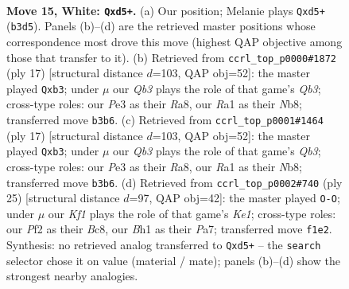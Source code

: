 \documentclass[11pt]{article}
\begin{document}
\clearpage

\begin{figure}[p]\centering
\begin{subfigure}{0.46\textwidth}\centering
\resizebox{\linewidth}{!}{%
\newchessgame
\chessboard[
  setfen={r1b2rk1/pp2n1bp/6p1/2pqpp1n/7P/1Q2PNP1/PP1P1P2/RNB1RK1B w - - 0 15},
  showmover=false,
  pgfstyle=straightmove, color=movearrow, markmove={b3-d5}
]}
\caption{}
\end{subfigure}\hfill
\begin{subfigure}{0.46\textwidth}\centering
\resizebox{\linewidth}{!}{%
\newchessgame
\chessboard[
  setfen={rnbr2k1/pp2ppbp/1qp2np1/3p4/N1PP4/1Q3NP1/PP2PPBP/R1B2RK1 b - - 7 9},
  showmover=false,
  pgfstyle=straightmove, color=movearrow, markmove={b6-b3}
]}
\caption{}
\end{subfigure}
\\[4pt]
\begin{subfigure}{0.46\textwidth}\centering
\resizebox{\linewidth}{!}{%
\newchessgame
\chessboard[
  setfen={rnbr2k1/pp2ppbp/1qp2np1/3p4/N1PP4/1Q3NP1/PP2PPBP/R1B2RK1 b - - 7 9},
  showmover=false,
  pgfstyle=straightmove, color=movearrow, markmove={b6-b3}
]}
\caption{}
\end{subfigure}\hfill
\begin{subfigure}{0.46\textwidth}\centering
\resizebox{\linewidth}{!}{%
\newchessgame
\chessboard[
  setfen={r1b1k2r/ppb2ppp/2n1p3/3qPn2/2NpQ3/1N3P2/PBPP2PP/R3KB1R b KQkq - 2 13},
  showmover=false,
  pgfstyle=straightmove, color=movearrow, markmove={e8-g8}
]}
\caption{}
\end{subfigure}
\caption{\textbf{Move 15, White: \texttt{Qxd5+}.} (a) Our position; Melanie plays \texttt{Qxd5+} (\texttt{b3d5}). Panels (b)--(d) are the retrieved master positions whose correspondence most drove this move (highest QAP objective among those that transfer to it). (b) Retrieved from \texttt{ccrl\_top\_p0000\#1872} (ply 17) [structural distance $d$=103, QAP obj=52]: the master played \texttt{Qxb3}; under $\mu$ our \emph{Qb3} plays the role of that game's \emph{Qb3}; cross-type roles: our \emph{P}e3 as their \emph{R}a8, our \emph{R}a1 as their \emph{N}b8; transferred move \texttt{b3b6}. (c) Retrieved from \texttt{ccrl\_top\_p0001\#1464} (ply 17) [structural distance $d$=103, QAP obj=52]: the master played \texttt{Qxb3}; under $\mu$ our \emph{Qb3} plays the role of that game's \emph{Qb3}; cross-type roles: our \emph{P}e3 as their \emph{R}a8, our \emph{R}a1 as their \emph{N}b8; transferred move \texttt{b3b6}. (d) Retrieved from \texttt{ccrl\_top\_p0002\#740} (ply 25) [structural distance $d$=97, QAP obj=42]: the master played \texttt{O-O}; under $\mu$ our \emph{Kf1} plays the role of that game's \emph{Ke1}; cross-type roles: our \emph{P}f2 as their \emph{B}c8, our \emph{B}h1 as their \emph{P}a7; transferred move \texttt{f1e2}. Synthesis: no retrieved analog transferred to \texttt{Qxd5+} -- the \texttt{search} selector chose it on value (material / mate); panels (b)--(d) show the strongest nearby analogies.}
\label{fig:thought-m28}
\end{figure}
\end{document}
